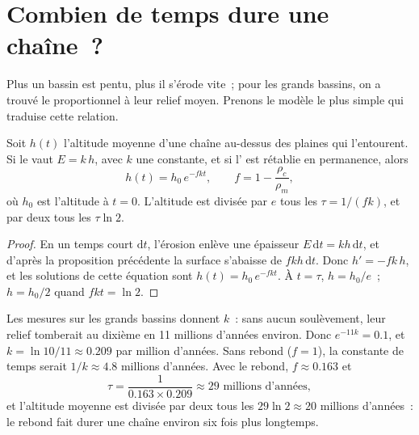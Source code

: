 \section{Combien de temps dure une chaîne~?}

Plus un bassin est pentu, plus il s'érode vite~; pour les grands bassins, on
a trouvé le  proportionnel à leur relief moyen. Prenons le
modèle le plus simple qui traduise cette relation.

\begin{proposition}\label{prop:g12:destruction-of-mountains:decay}
Soit $h(t)$ l'altitude moyenne d'une chaîne au-dessus des plaines qui
l'entourent. Si le  vaut $E = k\,h$, avec $k$ une
constante, et si l' est rétablie en permanence, alors
\[
  h(t) = h_0\, e^{-f k t}, \qquad f = 1 - \frac{\rho_c}{\rho_m},
\]
où $h_0$ est l'altitude à $t = 0$. L'altitude est divisée par $e$ tous les
$\tau = 1/(fk)$, et par deux tous les $\tau \ln 2$.
\end{proposition}

\begin{proof}
En un temps court $\mathrm{d}t$, l'érosion enlève une épaisseur $E\,\mathrm{d}t
= k h\,\mathrm{d}t$, et d'après la proposition précédente la surface
s'abaisse de $f k h\,\mathrm{d}t$. Donc $h' = -fk\,h$, et les solutions de
cette équation sont $h(t) = h_0\,e^{-fkt}$. À $t = \tau$, $h = h_0/e$~;
$h = h_0/2$ quand $fkt = \ln 2$.
\end{proof}

Les mesures sur les grands bassins donnent $k$~: sans aucun soulèvement,
leur relief tomberait au dixième en 11 millions d'années environ. Donc
$e^{-11k} = 0.1$, et $k =
\ln 10/11 \approx 0.209$ par million d'années. Sans rebond ($f = 1$), la
constante de temps serait $1/k \approx 4.8$ millions d'années. Avec le
rebond, $f
\approx 0.163$ et
\[
  \tau = \frac{1}{0.163 \times 0.209} \approx 29 \text{ millions d'années},
\]
et l'altitude moyenne est divisée par deux tous les
$29 \ln 2 \approx 20$ millions d'années~: le rebond fait durer une chaîne
environ six fois plus longtemps.


